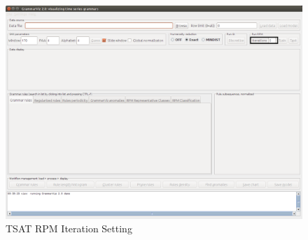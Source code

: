\documentclass[letterpaper, 12pt]{article}
\begin{document}
\begin{figure}[H]
  \includegraphics[width=\textwidth]{TSAT-iterations-setting}
  \caption{TSAT RPM Iteration Setting}
  \label{fig:TSAT-iteration-setting}
\end{figure}
\end{document}
